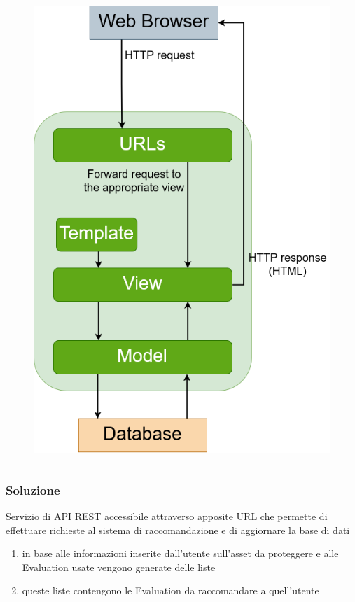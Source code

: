 \begin{frame}
\begin{columns}
\begin{column}{0.5\textwidth}
\begin{figure}
                \includegraphics[scale=0.5]{images/IB_CF_ex}
            \end{figure}
        \end{column}
    \end{columns}
\end{frame}

\begin{frame}
    \frametitle{Soluzione}
    Servizio di \alert{API REST} accessibile attraverso apposite URL che permette di effettuare richieste al sistema di 
    raccomandazione e di aggiornare la base di dati
    \begin{enumerate}
        \item in base alle informazioni inserite dall'utente sull'\alert{asset} da proteggere e alle Evaluation usate vengono generate delle 
        liste 
        \item queste liste contengono le Evaluation da raccomandare a quell'utente
    \end{enumerate}
\end{frame}

